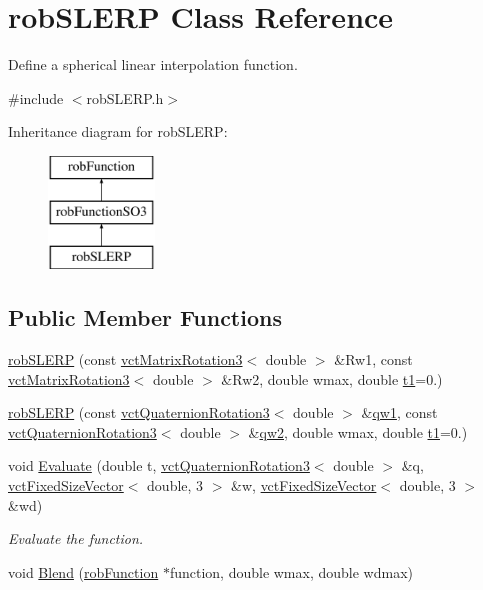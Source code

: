 \hypertarget{classrob_s_l_e_r_p}{\section{rob\-S\-L\-E\-R\-P Class Reference}
\label{classrob_s_l_e_r_p}
}


Define a spherical linear interpolation function.  




{\ttfamily \#include $<$rob\-S\-L\-E\-R\-P.\-h$>$}

Inheritance diagram for rob\-S\-L\-E\-R\-P\-:\begin{figure}[H]
\begin{center}
\leavevmode
\includegraphics[height=3.000000cm]{d0/dad/classrob_s_l_e_r_p}
\end{center}
\end{figure}
\subsection*{Public Member Functions}
\begin{DoxyCompactItemize}
\item 
\hyperlink{classrob_s_l_e_r_p_abe2cf92f80f117d47750187d40480679}{rob\-S\-L\-E\-R\-P} (const \hyperlink{classvct_matrix_rotation3}{vct\-Matrix\-Rotation3}$<$ double $>$ \&Rw1, const \hyperlink{classvct_matrix_rotation3}{vct\-Matrix\-Rotation3}$<$ double $>$ \&Rw2, double wmax, double \hyperlink{classrob_function_a9a4b408a3a5a8ae927caec3b6bac36ef}{t1}=0.)
\item 
\hyperlink{classrob_s_l_e_r_p_aaaeb4084e143f4ed8ffcbd0473fb75bd}{rob\-S\-L\-E\-R\-P} (const \hyperlink{classvct_quaternion_rotation3}{vct\-Quaternion\-Rotation3}$<$ double $>$ \&\hyperlink{classrob_function_s_o3_ab39d2e94ec47a7218e8e42209243c628}{qw1}, const \hyperlink{classvct_quaternion_rotation3}{vct\-Quaternion\-Rotation3}$<$ double $>$ \&\hyperlink{classrob_function_s_o3_ae8f7673ef36c4dcf8af771af852b974d}{qw2}, double wmax, double \hyperlink{classrob_function_a9a4b408a3a5a8ae927caec3b6bac36ef}{t1}=0.)
\item 
void \hyperlink{classrob_s_l_e_r_p_a2dd6fee7cb282ece5320c3d74e54af7c}{Evaluate} (double t, \hyperlink{classvct_quaternion_rotation3}{vct\-Quaternion\-Rotation3}$<$ double $>$ \&q, \hyperlink{classvct_fixed_size_vector}{vct\-Fixed\-Size\-Vector}$<$ double, 3 $>$ \&w, \hyperlink{classvct_fixed_size_vector}{vct\-Fixed\-Size\-Vector}$<$ double, 3 $>$ \&wd)
\begin{DoxyCompactList}\small\item\em Evaluate the function. \end{DoxyCompactList}\item 
void \hyperlink{classrob_s_l_e_r_p_ad562f5f1e1f2bc779edbded51d498448}{Blend} (\hyperlink{classrob_function}{rob\-Function} $\ast$function, double wmax, double wdmax)
\end{DoxyCompactItemize}
